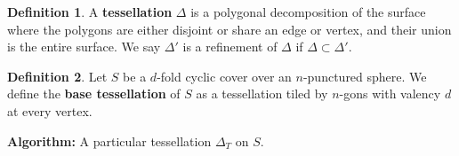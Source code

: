 \documentclass[12pt,reqno]{amsart}
\DeclareMathOperator{\Aut}{Aut}
\theoremstyle{definition}
\newtheorem{defn}{Definition}
\theoremstyle{remark}
\newcommand{\DD}{\Delta\kern -8.3pt {\diamond} \kern -4.5pt \cdot \:}
\begin{document}
\begin{defn} A \textbf{tessellation} $\Delta$ is a polygonal decomposition of the surface where the polygons are either disjoint or share an edge or vertex, and their union is the entire surface. We say $\Delta'$ is a refinement of $\Delta$ if $\Delta \subset \Delta'$. \end{defn}

\begin{defn} \label{defn: base tess} Let $S$ be a $d$-fold cyclic cover over an $n$-punctured sphere. We define the \textbf{base tessellation} of $S$ as a tessellation tiled by $n$-gons with valency $d$ at every vertex. \end{defn}


\textbf{Algorithm:} A particular tessellation $\Delta_T$ on $S$.


\end{document}
